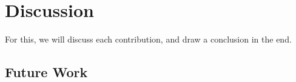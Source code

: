 \chapter{Discussion} \label{sec:discussion}

For this, we will discuss each contribution, and draw a conclusion in the end.

\todo[inline]{:)}

\section{\modelname{}}
\section{\programname{}}
\section{Future Work} \label{sec:future_work}


